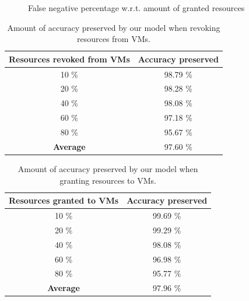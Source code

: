 \documentclass[twocolumn]{bmcart}%
\begin{document}
\begin{figure}[!ht]
    \label{fig1}
    \caption{False negative percentage w.r.t. amount of granted resources}
\end{figure}



\begin{table}[ht]\small
\caption{Amount of accuracy preserved by our model when revoking resources from VMs.}
\centering
 \begin{tabular}{c c}
 \hline
  \textbf{Resources revoked from VMs} & \textbf{Accuracy preserved}\\
  \hline
   10 \%  & 98.79 \% \\
   20 \% &  98.28 \% \\
   40 \% & 98.08 \%  \\
   60 \% & 97.18 \% \\
   80 \% & 95.67 \% \\
    \hline
   \textbf{Average} & 97.60 \% \\
\end{tabular}
\end{table}

\begin{table}[ht]\small
\caption{Amount of accuracy preserved by our model when granting resources to VMs.}
\centering
 \begin{tabular}{c c}
 \hline
  \textbf{Resources granted to VMs} & \textbf{Accuracy preserved }\\
  \hline
   10 \%  & 99.69 \% \\
   20 \% &  99.29 \% \\
   40 \% & 98.08 \%  \\
   60 \% & 96.98 \% \\
   80 \% & 95.77 \% \\
   \hline
   \textbf{Average} & 97.96 \% \\


\end{tabular}
\end{table}
%
%
\end{document}
